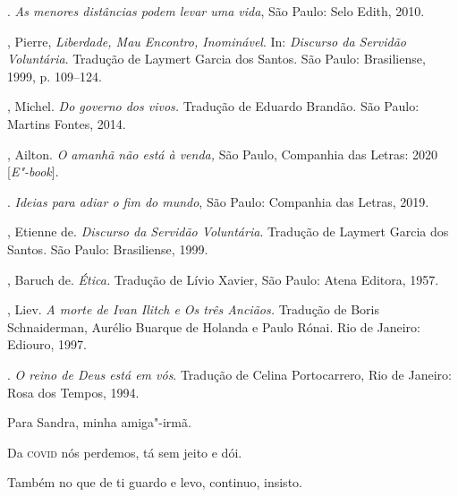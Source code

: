 \begin{bibliohedra}
. \emph{As menores distâncias podem levar uma vida}, São Paulo:
Selo Edith, 2010.

, Pierre, \emph{Liberdade, Mau Encontro, Inominável}. In:
\emph{Discurso da Servidão Voluntária}. Tradução de Laymert Garcia dos
Santos. São Paulo: Brasiliense, 1999, p. 109--124.

, Michel. \emph{Do governo dos vivos.} Tradução de Eduardo
Brandão. São Paulo: Martins Fontes, 2014.

, Ailton. \emph{O amanhã não está à venda,} São Paulo, Companhia
das Letras: 2020 {[}\emph{E"-book}{]}.

\titidem. \emph{Ideias para adiar o fim do mundo}, São Paulo: Companhia
das Letras, 2019.

, Etienne de. \emph{Discurso da Servidão Voluntária}. Tradução
de Laymert Garcia dos Santos. São Paulo: Brasiliense, 1999.

, Baruch de. \emph{Ética.} Tradução de Lívio Xavier, São Paulo:
Atena Editora, 1957.

, Liev. \emph{A morte de Ivan Ilitch e Os três Anciãos.} Tradução
de Boris Schnaiderman, Aurélio Buarque de Holanda e Paulo Rónai. Rio de
Janeiro: Ediouro, 1997.

\titidem. \emph{O reino de Deus está em vós}. Tradução de Celina
Portocarrero, Rio de Janeiro: Rosa dos Tempos, 1994.
\end{bibliohedra}


Para Sandra, minha amiga"-irmã.

Da \textsc{covid} nós perdemos, tá sem jeito e dói.

Também no que de ti guardo e levo, continuo, insisto.

